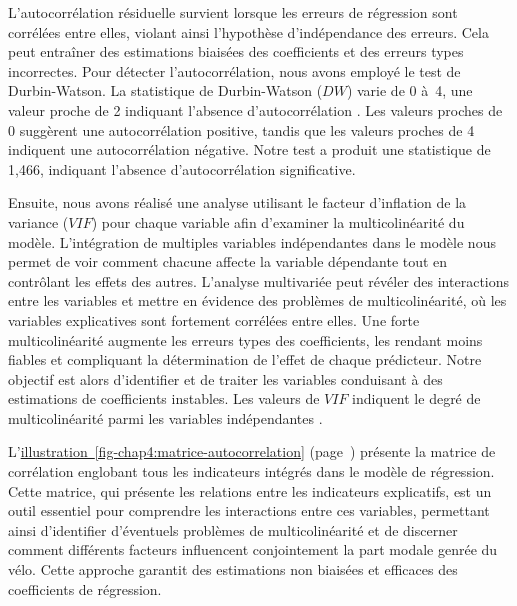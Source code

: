 \begin{refsegment}
L'autocorrélation résiduelle survient lorsque les erreurs de régression sont corrélées entre elles, violant ainsi l'hypothèse d'indépendance des erreurs. Cela peut entraîner des estimations biaisées des coefficients et des erreurs types incorrectes. Pour détecter l'autocorrélation, nous avons employé le test de Durbin-Watson. La statistique de Durbin-Watson (\(DW\)) varie de 0 à~4, une valeur proche de 2 indiquant l'absence d'autocorrélation \textcolor{blue}{\autocite{durbin_testing_1950}}. Les valeurs proches de 0 suggèrent une autocorrélation positive, tandis que les valeurs proches de 4 indiquent une autocorrélation négative. Notre test a produit une statistique de 1,466, indiquant l'absence d'autocorrélation significative.%

Ensuite, nous avons réalisé une analyse utilisant le facteur d'inflation de la variance (\(VIF\)) pour chaque variable afin d'examiner la multicolinéarité du modèle. L'intégration de multiples variables indépendantes dans le modèle nous permet de voir comment chacune affecte la variable dépendante tout en contrôlant les effets des autres. L'analyse multivariée peut révéler des interactions entre les variables et mettre en évidence des problèmes de multicolinéarité, où les variables explicatives sont fortement corrélées entre elles. Une forte multicolinéarité augmente les erreurs types des coefficients, les rendant moins fiables et compliquant la détermination de l'effet de chaque prédicteur. Notre objectif est alors d'identifier et de traiter les variables conduisant à des estimations de coefficients instables. Les valeurs de \(VIF\) indiquent le degré de multicolinéarité parmi les variables indépendantes \textcolor{blue}{\autocites{akinwande_variance_2015}{tamura_mixed_2019}}.%

L'\hyperref[fig-chap4:matrice-autocorrelation]{illustration~\ref{fig-chap4:matrice-autocorrelation}} (page~\pageref{fig-chap4:matrice-autocorrelation}) présente la matrice de corrélation englobant tous les indicateurs intégrés dans le modèle de régression. Cette matrice, qui présente les relations entre les indicateurs explicatifs, est un outil essentiel pour comprendre les interactions entre ces variables, permettant ainsi d'identifier d'éventuels problèmes de multicolinéarité et de discerner comment différents facteurs influencent conjointement la part modale genrée du vélo. Cette approche garantit des estimations non biaisées et efficaces des coefficients de régression.%


\end{refsegment}
